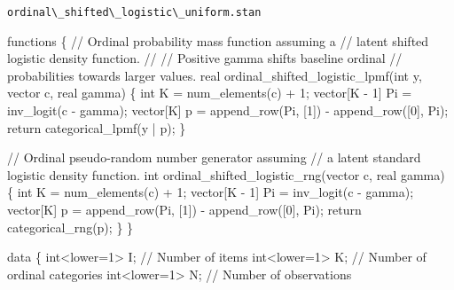 \documentclass[
  letterpaper,
  DIV=11,
  numbers=noendperiod]{scrartcl}
\newenvironment{Shaded}{\begin{snugshade}}{\end{snugshade}}
\newcommand{\CommentTok}[1]{\textcolor[rgb]{0.37,0.37,0.37}{#1}}
\newcommand{\ControlFlowTok}[1]{\textcolor[rgb]{0.00,0.23,0.31}{#1}}
\newcommand{\DataTypeTok}[1]{\textcolor[rgb]{0.68,0.00,0.00}{#1}}
\newcommand{\DecValTok}[1]{\textcolor[rgb]{0.68,0.00,0.00}{#1}}
\newcommand{\KeywordTok}[1]{\textcolor[rgb]{0.00,0.23,0.31}{#1}}
\newcommand{\NormalTok}[1]{\textcolor[rgb]{0.00,0.23,0.31}{#1}}
\begin{document}
\begin{codelisting}

\caption{\texttt{ordinal\textbackslash\_shifted\textbackslash\_logistic\textbackslash\_uniform.stan}}

\begin{Shaded}
\begin{Highlighting}[]
\KeywordTok{functions}\NormalTok{ \{}
  \CommentTok{// Ordinal probability mass function assuming a}
  \CommentTok{// latent shifted logistic density function.}
  \CommentTok{//}
  \CommentTok{// Positive gamma shifts baseline ordinal}
  \CommentTok{// probabilities towards larger values.}
  \DataTypeTok{real}\NormalTok{ ordinal\_shifted\_logistic\_lpmf(}\DataTypeTok{int}\NormalTok{ y, }\DataTypeTok{vector}\NormalTok{ c, }\DataTypeTok{real}\NormalTok{ gamma) \{}
    \DataTypeTok{int}\NormalTok{ K = num\_elements(c) + }\DecValTok{1}\NormalTok{;}
    \DataTypeTok{vector}\NormalTok{[K {-} }\DecValTok{1}\NormalTok{] Pi = inv\_logit(c {-} gamma);}
    \DataTypeTok{vector}\NormalTok{[K] p = append\_row(Pi, [}\DecValTok{1}\NormalTok{]\textquotesingle{}) {-} append\_row([}\DecValTok{0}\NormalTok{]\textquotesingle{}, Pi);}
    \ControlFlowTok{return}\NormalTok{ categorical\_lpmf(y | p);}
\NormalTok{  \}}

  \CommentTok{// Ordinal pseudo{-}random number generator assuming}
  \CommentTok{// a latent standard logistic density function.}
  \DataTypeTok{int}\NormalTok{ ordinal\_shifted\_logistic\_rng(}\DataTypeTok{vector}\NormalTok{ c, }\DataTypeTok{real}\NormalTok{ gamma) \{}
    \DataTypeTok{int}\NormalTok{ K = num\_elements(c) + }\DecValTok{1}\NormalTok{;}
    \DataTypeTok{vector}\NormalTok{[K {-} }\DecValTok{1}\NormalTok{] Pi = inv\_logit(c {-} gamma);}
    \DataTypeTok{vector}\NormalTok{[K] p = append\_row(Pi, [}\DecValTok{1}\NormalTok{]\textquotesingle{}) {-} append\_row([}\DecValTok{0}\NormalTok{]\textquotesingle{}, Pi);}
    \ControlFlowTok{return}\NormalTok{ categorical\_rng(p);}
\NormalTok{  \}}
\NormalTok{\}}

\KeywordTok{data}\NormalTok{ \{}
  \DataTypeTok{int}\NormalTok{\textless{}}\KeywordTok{lower}\NormalTok{=}\DecValTok{1}\NormalTok{\textgreater{} I; }\CommentTok{// Number of items}
  \DataTypeTok{int}\NormalTok{\textless{}}\KeywordTok{lower}\NormalTok{=}\DecValTok{1}\NormalTok{\textgreater{} K; }\CommentTok{// Number of ordinal categories}
  \DataTypeTok{int}\NormalTok{\textless{}}\KeywordTok{lower}\NormalTok{=}\DecValTok{1}\NormalTok{\textgreater{} N; }\CommentTok{// Number of observations}


\end{Highlighting}
\end{Shaded}
\end{codelisting}
\end{document}
